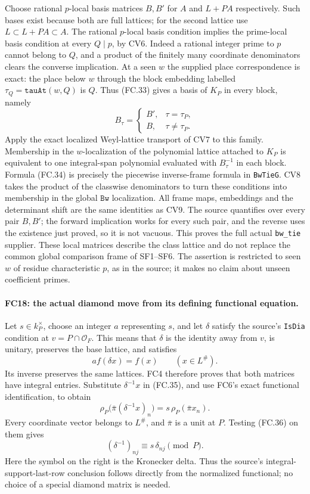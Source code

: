 \documentclass[11pt,a4paper]{article}
\numberwithin{equation}{section}
\theoremstyle{remark}\newtheorem{remark}[theorem]{Remark}
\begin{document}
Choose rational $p$-local basis matrices $B,B'$ for $A$ and
$L+PA$ respectively. Such bases exist because both are full lattices;
for the second lattice use $L\subset L+PA\subset A$.
The rational $p$-local basis condition implies the prime-local basis
condition at every $Q\mid p$, by CV6. Indeed a rational integer
prime to $p$ cannot belong to $Q$, and a product of the finitely many
coordinate denominators clears the converse implication.
At a seen $w$ the supplied place correspondence is exact:
the place below $w$ through the block embedding labelled
$\tau_Q=\texttt{tauAt}(w,Q)$ is $Q$.
Thus (FC.33) gives a basis of $K_P$ in every block, namely
\[
 B_\tau=\begin{cases}B',&\tau=\tau_P,\\B,&\tau\ne\tau_P.
            \end{cases}                              \tag{FC.34}
\]
Apply the exact localized Weyl-lattice transport of CV7 to this family.
Membership in the $w$-localization of the polynomial lattice attached
to $K_P$ is equivalent to one integral-span polynomial evaluated with
$B_\tau^{-1}$ in each block. Formula (FC.34) is precisely the
piecewise inverse-frame formula in \texttt{BwTieG}. CV8 takes the
product of the classwise denominators to turn these conditions into
membership in the global $\texttt{Bw}$ localization. All frame maps,
embeddings and the determinant shift are the same identities as CV9.
The source quantifies over every pair $B,B'$; the forward implication
works for every such pair, and the reverse uses the existence just proved,
so it is not vacuous. This proves the full actual \texttt{bw\_\allowbreak tie}
supplier. These local matrices describe the class lattice and do not
replace the common global comparison frame of SF1--SF6. The assertion
is restricted to seen $w$ of residue characteristic $p$, as in the
source; it makes no claim about unseen coefficient primes.

\paragraph{FC18: the actual diamond move from its defining functional
equation.}
Let $s\in k_P^\times$, choose an integer $a$ representing $s$,
and let $\delta$ satisfy the source's \texttt{IsDia} condition at
$v=P\cap\mathcal O_F$. This means that $\delta$ is the identity
away from $v$, is unitary, preserves the base lattice, and satisfies
\[
             a f(\delta x)=f(x)\qquad(x\in L^\#).
 \tag{FC.35}
\]
Its inverse preserves the same lattices. FC4 therefore proves that
both matrices have integral entries. Substitute $\delta^{-1}x$
in (FC.35), and use FC6's exact functional identification, to obtain
\[
 \rho_P\bigl(\bar\pi(\delta^{-1}x)_n\bigr)
                =s\,\rho_P(\bar\pi x_n).
 \tag{FC.36}
\]
Every coordinate vector belongs to $L^\#$, and $\bar\pi$ is a
unit at $P$. Testing (FC.36) on them gives
\[
        (\delta^{-1})_{nj}\equiv s\,\delta_{nj}\pmod P.
 \tag{FC.37}
\]
Here the symbol on the right is the Kronecker delta.
Thus the source's integral-support-last-row conclusion follows directly
from the normalized functional; no choice of a special diamond matrix
is needed.
\end{document}
